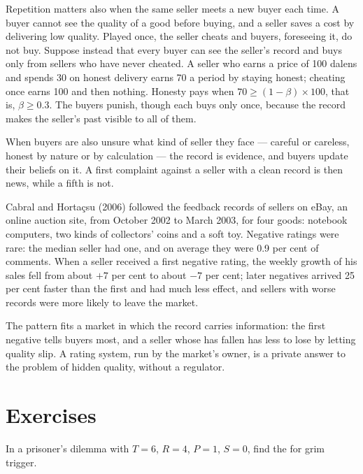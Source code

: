 Repetition matters also when the same seller meets a new buyer each time. A buyer cannot see the quality of a
good before buying, and a seller saves a cost by delivering low quality. Played once, the seller cheats and
buyers, foreseeing it, do not buy. Suppose instead that every buyer can see the seller's record and buys only from
sellers who have never cheated. A seller who earns a price of 100 dalens and spends 30 on honest delivery earns 70 a
period by staying honest; cheating once earns 100 and then nothing. Honesty pays when $70 \ge (1 - \beta) \times 100$, that is, $\beta
\ge 0.3$. The buyers punish, though each buys only once, because the record makes the seller's past visible to all
of them.

When buyers are also unsure what kind of seller they face --- careful or careless, honest by nature or by
calculation --- the record is evidence, and buyers update their beliefs on it. A first complaint against a seller
with a clean record is then news, while a fifth is not.

\begin{record}
Cabral and Horta\c{c}su (2006) followed the feedback records of sellers on eBay, an online auction site, from
October 2002 to March 2003, for four goods: notebook computers, two kinds of collectors' coins and a soft toy.
Negative ratings were rare: the median seller had one, and on average they were 0.9 per cent of comments. When a
seller received a first negative rating, the weekly growth of his sales fell from about $+7$ per cent to about $-7$
per cent; later negatives arrived 25 per cent faster than the first and had much less effect, and sellers with
worse records were more likely to leave the market.
\end{record}

The pattern fits a market in which the record carries information: the first negative tells buyers most, and a
seller whose  has fallen has less to lose by letting quality slip. A rating system, run by the market's
owner, is a private answer to the problem of hidden quality, without a regulator.

\section{Exercises}\label{sec:b2:repeated-games:exercises}

\begin{exercise}[$\star$]\label{exo:b2:repeated-games:1}
In a prisoner's dilemma with $T = 6$, $R = 4$, $P = 1$, $S = 0$, find the  for grim trigger.
\end{exercise}

